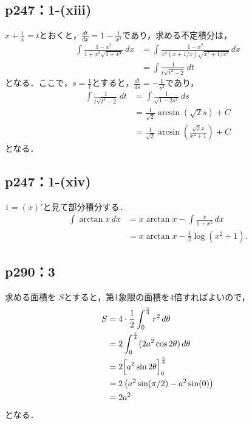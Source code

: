 \documentclass[a4paper,10pt,fleqn]{ltjsarticle}
\begin{document}
\subsection*{p247：1-(xiii)}


\begin{tleftbar}
    $x+\frac{1}{x}=t$とおくと，$\frac{dt}{dx}=1-\frac{1}{x^2}$であり，求める不定積分は，
    \begin{align*} 
        \int \frac{1-x^2}{1+x^2\sqrt{1+x^4}} \, dx & = \int \frac{1-x^2}{x^2 (x+1/x)\sqrt{x^2 + 1/x^2}} \, dx \\
        & =\int \frac{1}{t\sqrt{t^2-2}} \, dt
    \end{align*}
    となる．ここで，$s=\frac{1}{t}$とすると，$\frac{dt}{ds}=-\frac{1}{s^2}$であり，
    \begin{align*} 
        \int \frac{1}{t \sqrt{t^2-2}} \, dt & = \int \frac{1}{\sqrt{1-2s^2}} \, ds \\
        & = \frac{1}{\sqrt{2}} \arcsin (\sqrt{2}s)+C \\
        & = \frac{1}{\sqrt{2}} \arcsin \left (\frac{\sqrt{2}x}{x^2+1} \right)+C
    \end{align*}
    となる．
\end{tleftbar}

\subsection*{p247：1-(xiv)}


\begin{leftbar}
    $1 = (x)'$と見て部分積分する．
    \begin{align*}
      \int \arctan x \,dx
      &= x \arctan x - \int \frac{x}{1+x^2} \,dx \\
      &= x \arctan x - \frac{1}{2} \log (x^2+1).
    \end{align*}
  \end{leftbar}

\newpage 


\subsection*{p290：3}

\begin{leftbar}
    求める面積を $S$とすると，第1象限の面積を$4$倍すればよいので，
    \begin{align*} 
        S & =4 \cdot  \frac{1}{2}\int_{0}^{\frac{\pi}{4}} r^2 \, d \theta \\
        & = 2 \int_{0}^{\frac{\pi}{4}} (2a^2 \cos 2\theta) \, d \theta \\
        & =2\Bigl [ a^2 \sin 2\theta \Bigl ]_{0}^{\frac{\pi}{4}} \\
        & = 2\left ( a^2 \sin (\pi/2)-a^2 \sin (0) \right) \\
        & = 2a^2
    \end{align*} 
    となる．
\end{leftbar}
\end{document}
